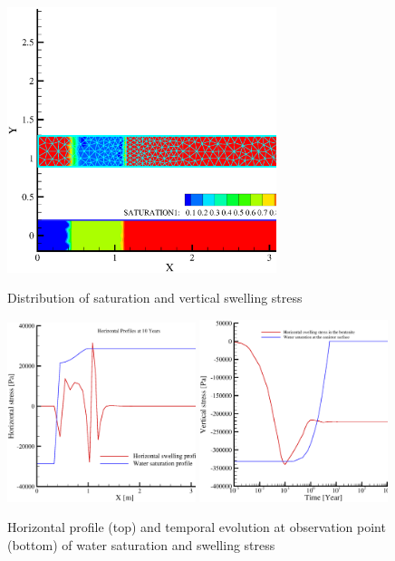 \begin{figure}[!t]
\begin{center}
\includegraphics[width=0.7\textwidth]{chapter_14/figures/fig_14_2_19}
\end{center}
\caption{Distribution of saturation and vertical swelling stress}
\label{fig:hmswl_cont}
\begin{center}
\includegraphics[width=0.49\textwidth]{chapter_14/figures/fig_14_2_20_a}
\includegraphics[width=0.49\textwidth]{chapter_14/figures/fig_14_2_20_b}
\end{center}
\caption{Horizontal profile (top) and temporal evolution at observation point (bottom) of water saturation and swelling stress}
\label{fig:deco-hm}
\end{figure}

